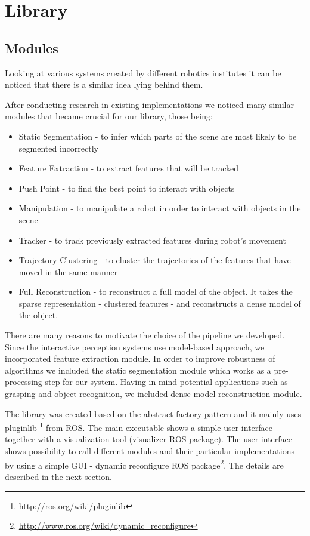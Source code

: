 \section{Library}
\subsection{Modules}
Looking at various systems created by different robotics institutes  it can be noticed that there is a similar idea lying behind them.  

After conducting research in existing implementations we noticed many similar modules that became crucial for our library, those being:

\begin{itemize}
\item Static Segmentation - to infer which parts of the scene are most likely to be segmented incorrectly
\item Feature Extraction - to extract features that will be tracked
\item Push Point - to find the best point to interact with objects
\item Manipulation - to manipulate a robot in order to interact with objects in the scene
\item Tracker - to track previously extracted features during robot's movement
\item Trajectory Clustering - to cluster the trajectories of the features that have moved in the same manner
\item Full Reconstruction - to reconstruct a full model of the object. It takes the sparse representation - clustered features - and reconstructs a dense model of the object.
\end{itemize}

There are many reasons to motivate the choice of the pipeline we developed. Since the interactive perception systems use model-based approach, we incorporated feature extraction module. In order to improve robustness of algorithms we included the static segmentation module which works as a pre-processing step for our system. Having in mind potential applications such as grasping and object recognition, we included dense model reconstruction module.

The library was created based on the abstract factory pattern and it mainly uses pluginlib \footnote{\url{http://ros.org/wiki/pluginlib}} from ROS. The main executable shows a simple user interface together with a visualization tool (visualizer ROS package). The user interface shows possibility to call different modules and their particular implementations by using a simple GUI - dynamic reconfigure ROS package\footnote{\url{http://www.ros.org/wiki/dynamic_reconfigure}}. The details are described in the next section.


